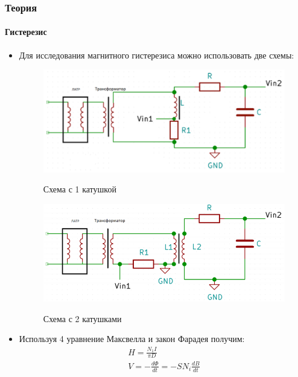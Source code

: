 \documentclass[8pt,pdf,hyperref={unicode}]{beamer}
\begin{document}
	\begin{frame}
		\frametitle{Теория} 
		\framesubtitle{Гистерезис}
		\begin{center}
			\begin{itemize}
			\item Для исследования магнитного гистерезиса можно использовать две схемы:
			\begin{figure}[ht]
				\begin{minipage}{.45\textwidth}
					\label{figure1}
					\centering
					\includegraphics[width=1.0\linewidth]{схема2.png}
					\caption{Схема с 1 катушкой}
				\end{minipage}
				\begin{minipage}{.45\textwidth}
					\label{figure2}
					\centering
					\includegraphics[width=1.0\linewidth]{схема3.png}
					\caption{Схема с 2 катушками}	
				\end{minipage}
			\label{fig:2}
			\end{figure}
			\item Используя 4 уравнение Максвелла и закон Фарадея получим:
			\begin{equation}
				\begin{gathered}
				H = \frac{N_1 I}{\pi D} \\
				V = -\frac{d\Phi}{dt} = -S N_i\frac{dB}{dt} \\
				\end{gathered}
			\end{equation}
			\end{itemize}
		\end{center}
	\end{frame}
\end{document}
